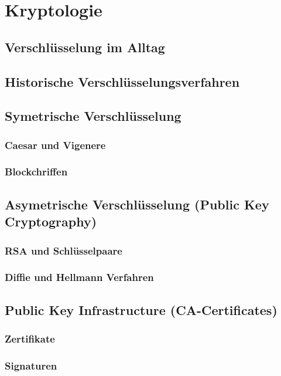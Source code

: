\section{Kryptologie}
\subsection{Verschlüsselung im Alltag}
\subsection{Historische Verschlüsselungsverfahren}
\subsection{Symetrische Verschlüsselung}

\subsubsection{Caesar und Vigenere}
\subsubsection{Blockchriffen}

\subsection{Asymetrische Verschlüsselung (Public Key Cryptography)}
\subsubsection{RSA und Schlüsselpaare}
\subsubsection{Diffie und Hellmann Verfahren}
\subsection{Public Key Infrastructure (CA-Certificates)}
\subsubsection{Zertifikate}
\subsubsection{Signaturen}